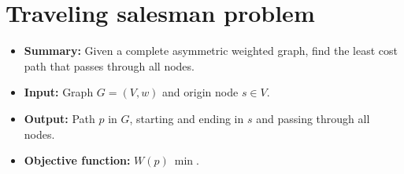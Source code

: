 \section{Traveling salesman problem} \label{algorithm-tsp}
\begin{itemize}
    \item \textbf{Summary:} Given a complete asymmetric weighted graph, find the least cost path that passes through all nodes. 
    \item \textbf{Input:} Graph $G=(V,w)$ and origin node $s \in V$.
    \item \textbf{Output:} Path $p$ in $G$, starting and ending in $s$ and passing through all nodes.
    \item \textbf{Objective function:} $W(p)~\min$.
\end{itemize}


